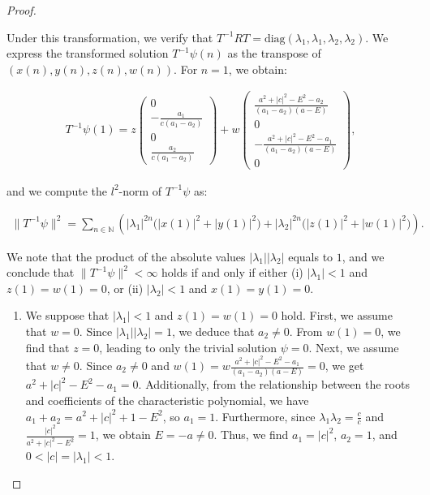 \documentclass{amsart}
\theoremstyle{definition}
\theoremstyle{remark}
\begin{document}
\begin{proof}
\begin{enumerate}
    Under this transformation, we verify that \(T^{-1} R T = \text{diag}(\lambda_1, \lambda_1, \lambda_2, \lambda_2)\). We express the transformed solution \(T^{-1} \psi(n)\) as the transpose of \((x(n), y(n), z(n), w(n))\). For \(n = 1\), we obtain:

    \begin{align*}
    T^{-1} \psi(1) = z \begin{pmatrix} 0 \\ -\frac{a_1}{c (a_1 - a_2)} \\ 0 \\ \frac{a_2}{c (a_1 - a_2)} \end{pmatrix} +
    w \begin{pmatrix} \frac{a^2 + |c|^2 - E^2 - a_2}{(a_1 - a_2)(a - E)} \\ 0 \\ -\frac{a^2 + |c|^2 - E^2 - a_1}{(a_1 - a_2)(a - E)} \\ 0 \end{pmatrix},
    \end{align*}

    and we compute the \(l^2\)-norm of \(T^{-1} \psi\) as:

    \begin{align*}
    \| T^{-1} \psi \|^2 = \sum_{n \in \mathbb{N}} \left( |\lambda_1|^{2n} \big( |x(1)|^2 + |y(1)|^2 \big) + |\lambda_2|^{2n} \big( |z(1)|^2 + |w(1)|^2 \big) \right).
    \end{align*}

    We note that the product of the absolute values \(|\lambda_1| |\lambda_2|\) equals to $1$, and we conclude that \(\| T^{-1} \psi \|^2 < \infty\) holds if and only if either (i) \(|\lambda_1| < 1\) and \(z(1) = w(1) = 0\), or (ii) \(|\lambda_2| < 1\) and \(x(1) = y(1) = 0\).

    \begin{enumerate}
        \item We suppose that \(|\lambda_1| < 1\) and \(z(1) = w(1) = 0\) hold. First, we assume that \(w = 0\). Since \(|\lambda_1| |\lambda_2| = 1\), we deduce that \(a_2 \neq 0\). From \(w(1) = 0\), we find that \(z = 0\), leading to only the trivial solution \(\psi = 0\). Next, we assume that \(w \neq 0\). Since \(a_2 \neq 0\) and \(w(1) = w \frac{a^2 + |c|^2 - E^2 - a_1}{(a_1 - a_2)(a - E)} = 0\), we get \(a^2 + |c|^2 - E^2 - a_1 = 0\). Additionally, from the relationship between the roots and coefficients of the characteristic polynomial, we have \(a_1 + a_2 = a^2 + |c|^2 + 1 - E^2\), so \(a_1 = 1\). Furthermore, since \(\lambda_1 \lambda_2 = \frac{c}{\bar{c}}\) and \(\frac{|c|^2}{a^2 + |c|^2 - E^2} = 1\), we obtain \(E = -a \neq 0\). Thus, we find \(a_1 = |c|^2\), \(a_2 = 1\), and \(0 < |c| = |\lambda_1| < 1\).


\end{enumerate}
\end{enumerate}
\end{proof}
\end{document}
